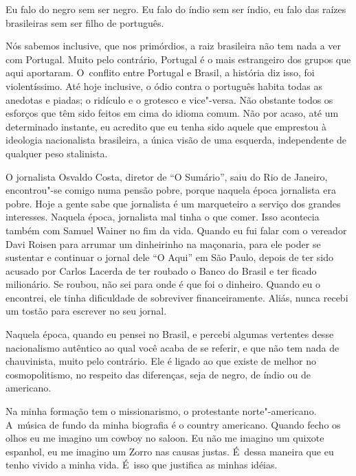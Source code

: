 Eu falo do negro sem ser negro. Eu falo do índio sem ser índio, eu falo
das raízes brasileiras sem ser filho de português.

 

Nós sabemos inclusive, que nos primórdios, a raiz brasileira não tem
nada a ver com Portugal. Muito pelo contrário, Portugal é o mais
estrangeiro dos grupos que aqui aportaram. O~conflito entre Portugal e
Brasil, a história diz isso, foi violentíssimo. Até hoje inclusive, o
ódio contra o português habita todas as anedotas e piadas; o ridículo e
o grotesco e vice"-versa. Não obstante todos os esforços que têm sido
feitos em cima do idioma comum. Não por acaso, até um determinado
instante, eu acredito que eu tenha sido aquele que emprestou à ideologia
nacionalista brasileira, a única visão de uma esquerda, independente de
qualquer peso stalinista.

 

O jornalista Osvaldo Costa, diretor de ``O Sumário'', saiu do Rio de
Janeiro, encontrou"-se comigo numa pensão pobre, porque naquela época
jornalista era pobre. Hoje a gente sabe que jornalista é um marqueteiro
a serviço dos grandes interesses. Naquela época, jornalista mal tinha o
que comer. Isso acontecia também com Samuel Wainer no fim da vida.
Quando eu fui falar com o vereador Davi Roisen para arrumar um
dinheirinho na maçonaria, para ele poder se sustentar e continuar o
jornal dele ``O Aqui'' em São Paulo, depois de ter sido acusado por
Carlos Lacerda de ter roubado o Banco do Brasil e ter ficado milionário.
Se roubou, não sei para onde é que foi o dinheiro. Quando eu o
encontrei, ele tinha dificuldade de sobreviver financeiramente. Aliás,
nunca recebi um tostão para escrever no seu jornal.

 

Naquela época, quando eu pensei no Brasil, e percebi algumas vertentes
desse nacionalismo autêntico ao qual você acaba de se referir, e que não
tem nada de chauvinista, muito pelo contrário. Ele é ligado ao que
existe de melhor no cosmopolitismo, no respeito das diferenças, seja de
negro, de índio ou de americano.

 

Na minha formação tem o missionarismo, o protestante norte"-americano. A~música de fundo da minha biografia é o country americano. Quando fecho
os olhos eu me imagino um cowboy no saloon. Eu não me imagino um quixote
espanhol, eu me imagino um Zorro nas causas justas. É~dessa maneira que
eu tenho vivido a minha vida. É~isso que justifica as minhas idéias.

